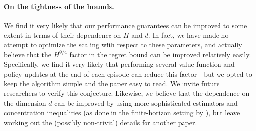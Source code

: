 \paragraph{On the tightness of the bounds.} We find it very likely that our performance guarantees can be improved to some extent in terms of their dependence on $H$ and $d$. In fact, we have made no attempt to optimize the scaling with respect to these parameters, and actually believe that the $H^{9/4}$ factor in the regret bound can be improved relatively easily. Specifically, we find it very likely that performing several value-function and policy updates at the end of each episode can reduce this factor---but we opted to keep the algorithm simple and the paper easy to read. We invite future researchers to verify this conjecture. Likewise, we believe that the dependence on the dimension $d$ can be improved by using more sophisticated estimators and concentration inequalities (as done in the finite-horizon setting by \citealp{he2023nearly,agarwal2023vo}), but leave working out the (possibly non-trivial) details for another paper.
